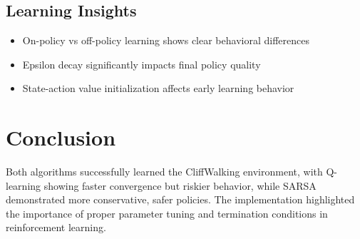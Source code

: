 \documentclass{article}
\begin{document}
\subsection*{Learning Insights}
\begin{itemize}
    \item On-policy vs off-policy learning shows clear behavioral differences
    \item Epsilon decay significantly impacts final policy quality
    \item State-action value initialization affects early learning behavior
\end{itemize}

\section{Conclusion}
Both algorithms successfully learned the CliffWalking environment, with Q-learning showing faster convergence but riskier behavior, while SARSA demonstrated more conservative, safer policies. The implementation highlighted the importance of proper parameter tuning and termination conditions in reinforcement learning.
\end{document}
